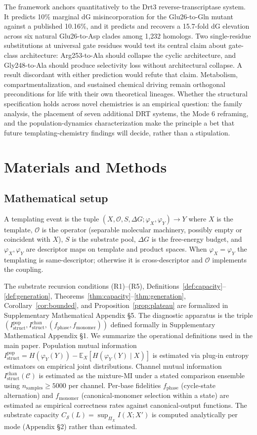 \documentclass[aps,prx,reprint,amsmath,amssymb,floatfix,superscriptaddress,nofootinbib]{revtex4-2}
\theoremstyle{plain-thm}
\theoremstyle{definition-thm}
\newcommand{\Istructpop}{I_{\mathrm{struct}}^{\mathrm{pop}}}
\newcommand{\Istructchan}{I_{\mathrm{struct}}^{\mathrm{chan}}}
\newcommand{\fphase}{f_{\mathrm{phase}}}
\newcommand{\fmonomer}{f_{\mathrm{monomer}}}
\newcommand{\Csub}{C_{\mathcal{S}}}
\newcommand{\descX}{\varphi_X}
\newcommand{\descY}{\varphi_Y}
\newcommand{\Op}{\mathcal{O}}
\begin{document}
The framework anchors quantitatively to the Drt3 reverse-transcriptase system. It predicts 10\% marginal dG misincorporation for the Glu26-to-Gln mutant against a published 10.16\%, and it predicts and recovers a 15.7-fold dG elevation across six natural Glu26-to-Asp clades among 1{,}232 homologs. Two single-residue substitutions at universal gate residues would test its central claim about gate-class architecture: Arg253-to-Ala should collapse the cyclic architecture, and Gly248-to-Ala should produce selectivity loss without architectural collapse. A result discordant with either prediction would refute that claim. Metabolism, compartmentalization, and sustained chemical driving remain orthogonal preconditions for life with their own theoretical lineages. Whether the structural specification holds across novel chemistries is an empirical question: the family analysis, the placement of seven additional DRT systems, the Mode 6 reframing, and the population-dynamics characterization make the principle a bet that future templating-chemistry findings will decide, rather than a stipulation.


\section{Materials and Methods}

\subsection{Mathematical setup}

A templating event is the tuple $(X, \Op, S, \Delta G; \descX, \descY) \to Y$ where $X$ is the template, $\Op$ is the operator (separable molecular machinery, possibly empty or coincident with $X$), $S$ is the substrate pool, $\Delta G$ is the free-energy budget, and $\descX, \descY$ are descriptor maps on template and product spaces. When $\descX = \descY$ the templating is same-descriptor; otherwise it is cross-descriptor and $\Op$ implements the coupling.

The substrate recursion conditions (R1)--(R5), Definitions~\ref{def:capacity}--\ref{def:generation}, Theorems~\ref{thm:capacity}--\ref{thm:generation}, Corollary~\ref{cor:bounded}, and Proposition~\ref{prop:plateau} are formalized in Supplementary Mathematical Appendix \S5. The diagnostic apparatus is the triple $(\Istructpop, \Istructchan, (\fphase, \fmonomer))$ defined formally in Supplementary Mathematical Appendix \S1. We summarize the operational definitions used in the main paper. Population mutual information $\Istructpop = H(\descY(Y)) - \mathbb{E}_X[H(\descY(Y) \mid X)]$ is estimated via plug-in entropy estimators on empirical joint distributions. Channel mutual information $\Istructchan(\mathcal{C})$ is estimated as the mixture-MI under a stated comparison ensemble using $n_{\mathrm{samples}} \ge 5000$ per channel. Per-base fidelities $\fphase$ (cycle-state alternation) and $\fmonomer$ (canonical-monomer selection within a state) are estimated as empirical correctness rates against canonical-output functions. The substrate capacity $\Csub(L) = \sup_{\Pi_X} I(X; X')$ is computed analytically per mode (Appendix \S2) rather than estimated.
\end{document}
